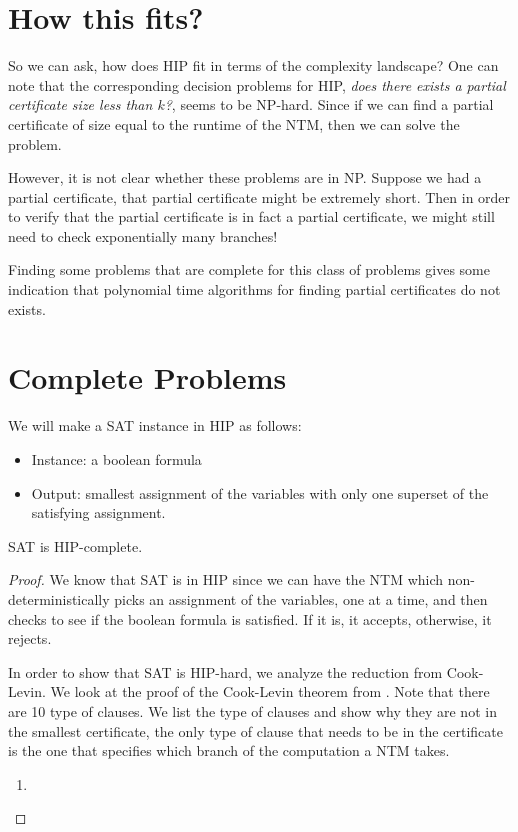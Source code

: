 \documentclass[runningheads,a4paper]{llncs}
\begin{document}
\section{How this fits?}

So we can ask, how does HIP fit in terms of the complexity landscape? One can note that the corresponding decision problems for HIP, \emph{does there exists a partial certificate size less than $k$?}, seems to be NP-hard. Since if we can find a partial certificate of size equal to the runtime of the NTM, then we can solve the problem.

However, it is not clear whether these problems are in NP. Suppose we had a partial certificate, that partial certificate might be extremely short. Then in order to verify that the partial certificate is in fact a partial certificate, we might still need to check exponentially many branches!

Finding some problems that are complete for this class of problems gives some indication that polynomial time algorithms for finding partial certificates do not exists.

\section{Complete Problems}

We will make a SAT instance in HIP as follows:
\begin{itemize}
\item Instance: a boolean formula
\item Output: smallest assignment of the variables with only one superset of the satisfying assignment.
\end{itemize}

\begin{theorem}
SAT is HIP-complete.
\end{theorem}

\begin{proof}
We know that SAT is in HIP since we can have the NTM which non-deterministically picks an assignment of the variables, one at a time, and then checks to see if the boolean formula is satisfied. If it is, it accepts, otherwise, it rejects. 

In order to show that SAT is HIP-hard, we analyze the reduction from Cook-Levin. We look at the proof of the Cook-Levin theorem from \cite{Garey}. Note that there are 10 type of clauses. We list the type of clauses and show why they are not in the smallest certificate, the only type of clause that needs to be in the certificate is the one that specifies which branch of the computation a NTM takes. 

\begin{enumerate}
\item
\end{enumerate}
\end{proof}



\end{document}

